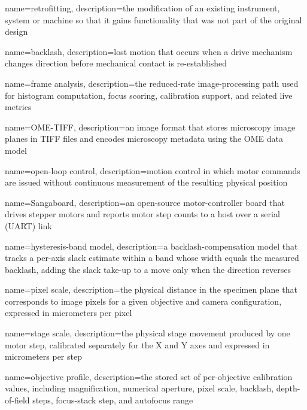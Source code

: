 \makeglossaries

{
    name={retrofitting},
    description={the modification of an existing instrument, system or machine so that it gains functionality that was not part of the original design}
}

{
    name={backlash},
    description={lost motion that occurs when a drive mechanism changes direction before mechanical contact is re-established}
}

{
    name={frame analysis},
    description={the reduced-rate image-processing path used for histogram computation, focus scoring, calibration support, and related live metrics}
}

{
    name={OME-TIFF},
    description={an image format that stores microscopy image planes in TIFF files and encodes microscopy metadata using the OME data model}
}

{
    name={open-loop control},
    description={motion control in which motor commands are issued without continuous measurement of the resulting physical position}
}

{
    name={Sangaboard},
    description={an open-source motor-controller board that drives stepper motors and reports motor step counts to a host over a serial (UART) link}
}

{
    name={hysteresis-band model},
    description={a backlash-compensation model that tracks a per-axis slack estimate within a band whose width equals the measured backlash, adding the slack take-up to a move only when the direction reverses}
}

{
    name={pixel scale},
    description={the physical distance in the specimen plane that corresponds to image pixels for a given objective and camera configuration, expressed in micrometers per pixel}
}

{
    name={stage scale},
    description={the physical stage movement produced by one motor step, calibrated separately for the X and Y axes and expressed in micrometers per step}
}

{
    name={objective profile},
    description={the stored set of per-objective calibration values, including magnification, numerical aperture, pixel scale, backlash, depth-of-field steps, focus-stack step, and autofocus range}
}

